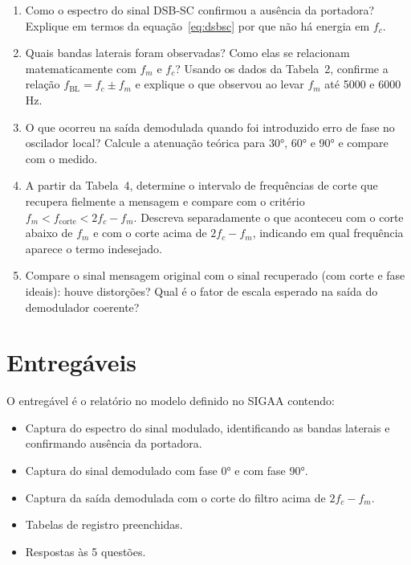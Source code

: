 \documentclass[11pt,a4paper]{article}
\begin{document}
\begin{enumerate}[label=\textbf{Q\arabic*.}, leftmargin=*]

  \item Como o espectro do sinal DSB-SC confirmou a ausência da portadora?
    Explique em termos da equação~\eqref{eq:dsbsc} por que não há energia em
    $f_c$.

  \item Quais bandas laterais foram observadas? Como elas se relacionam
    matematicamente com $f_m$ e $f_c$? Usando os dados da Tabela~2,
    confirme a relação $f_\text{BL} = f_c \pm f_m$ e explique o que
    observou ao levar $f_m$ até 5000 e 6000\,Hz.

  \item O que ocorreu na saída demodulada quando foi introduzido erro de fase
    no oscilador local? Calcule a atenuação teórica para 30°, 60° e 90° e
    compare com o medido.

  \item A partir da Tabela~4, determine o intervalo de frequências de corte
    que recupera fielmente a mensagem e compare com o critério
    $f_m < f_\text{corte} < 2f_c - f_m$.  Descreva separadamente o que
    aconteceu com o corte abaixo de $f_m$ e com o corte acima de
    $2f_c - f_m$, indicando em qual frequência aparece o termo indesejado.

  \item Compare o sinal mensagem original com o sinal recuperado (com corte
    e fase ideais): houve distorções? Qual é o fator de escala esperado na
    saída do demodulador coerente?

\end{enumerate}

\section{Entregáveis}

O entregável é o relatório no modelo definido no SIGAA contendo:

\begin{itemize}
  \item Captura do espectro do sinal modulado, identificando as bandas
    laterais e confirmando ausência da portadora.
  \item Captura do sinal demodulado com fase 0° e com fase 90°.
  \item Captura da saída demodulada com o corte do filtro acima de
    $2f_c - f_m$.
  \item Tabelas de registro preenchidas.
  \item Respostas às 5 questões.
\end{itemize}
\end{document}
